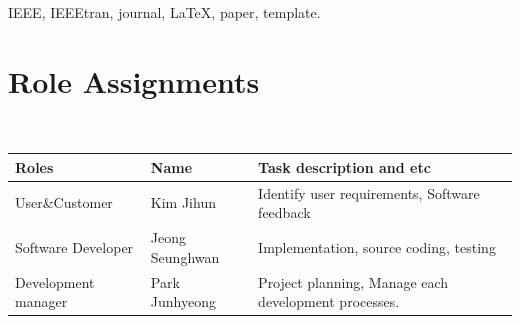 \documentclass[journal]{IEEEtran}
\begin{document}
\begin{IEEEkeywords}
IEEE, IEEEtran, journal, \LaTeX, paper, template.
\end{IEEEkeywords}





\IEEEpeerreviewmaketitle









\section*{Role Assignments}\\





\begin{table}[h]

\renewcommand{\arraystretch}{2.3}
\centering
\begin{tabular}{ | m{2cm} | m{1.5cm}| m{4cm} | } 
\hline
\bfseries Roles & \bfseries Name & \bfseries Task description and etc\\
\hline

User\&Customer & Kim Jihun &Identify user requirements, Software feedback\\
\hline
Software Developer & Jeong Seunghwan&Implementation, source coding, testing\\
\hline
Development manager & Park Junhyeong & Project planning, Manage each development processes.\\
\hline
\end{tabular}
\end{table}
\end{document}
